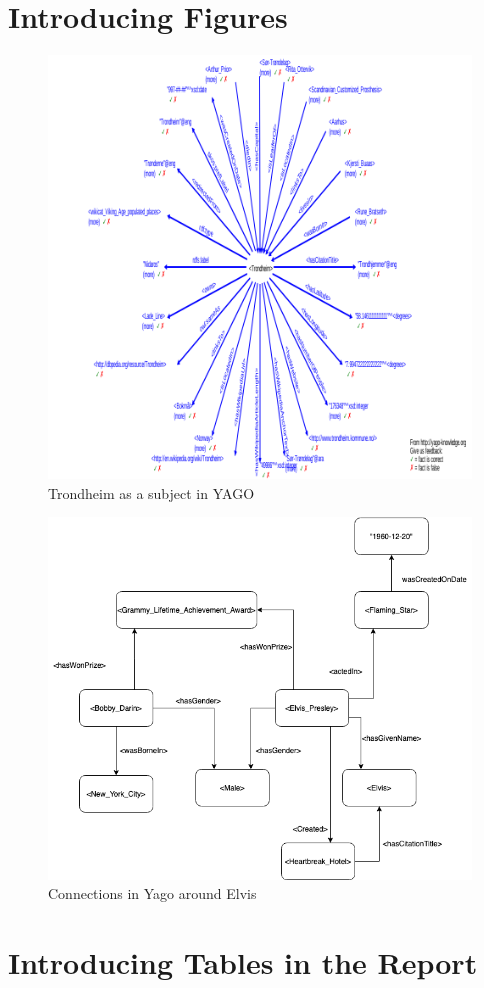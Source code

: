 \section{Introducing Figures}
\begin{figure}[t]
  \centering
  \includegraphics[scale=0.3]{figs/yago_trondheim.png}
 \caption{Trondheim as a subject in YAGO}
 \label{fig:Trondheim}
\end{figure}

\begin{figure}[t]
  \centering
  \includegraphics[scale=0.5]{figs/yagoExample.png}
 \caption{Connections in Yago around Elvis}
 \label{fig:Elvis}
\end{figure}

\section{Introducing Tables in the Report}

\glsresetall
